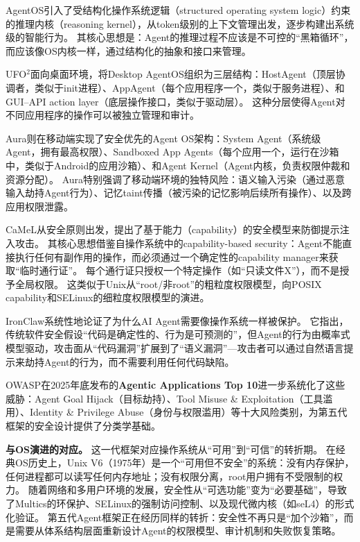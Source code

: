 AgentOS\cite{agentos2025}引入了受结构化操作系统逻辑（structured operating system logic）约束的推理内核（reasoning kernel），从token级别的上下文管理出发，逐步构建出系统级的智能行为。
其核心思想是：Agent的推理过程不应该是不可控的``黑箱循环''，而应该像OS内核一样，通过结构化的抽象和接口来管理。

UFO$^2$\cite{ufo2_2025}面向桌面环境，将Desktop AgentOS组织为三层结构：HostAgent（顶层协调者，类似于init进程）、AppAgent（每个应用程序一个，类似于服务进程）、和GUI--API action layer（底层操作接口，类似于驱动层）。
这种分层使得Agent对不同应用程序的操作可以被独立管理和审计。

Aura\cite{aura2025}则在移动端实现了安全优先的Agent OS架构：System Agent（系统级Agent，拥有最高权限）、Sandboxed App Agents（每个应用一个，运行在沙箱中，类似于Android的应用沙箱）、和Agent Kernel（Agent内核，负责权限仲裁和资源分配）。
Aura特别强调了移动端环境的独特风险：语义输入污染（通过恶意输入劫持Agent行为）、记忆taint传播（被污染的记忆影响后续所有操作）、以及跨应用权限泄露。

CaMeL\cite{debenedetti2025camel}从安全原则出发，提出了基于能力（capability）的安全模型来防御提示注入攻击。
其核心思想借鉴自操作系统中的capability-based security：Agent不能直接执行任何有副作用的操作，而必须通过一个确定性的capability manager来获取``临时通行证''。
每个通行证只授权一个特定操作（如``只读文件X''），而不是授予全局权限。
这类似于Unix从``root/非root''的粗粒度权限模型，向POSIX capability和SELinux的细粒度权限模型的演进。

IronClaw\cite{ironclaw2025}系统性地论证了为什么AI Agent需要像操作系统一样被保护。
它指出，传统软件安全假设``代码是确定性的、行为是可预测的''，但Agent的行为由概率式模型驱动，攻击面从``代码漏洞''扩展到了``语义漏洞''---攻击者可以通过自然语言提示来劫持Agent的行为，而不需要利用任何代码缺陷。

OWASP在2025年底发布的\textbf{Agentic Applications Top 10}\cite{owasp_agentic2026}进一步系统化了这些威胁：Agent Goal Hijack（目标劫持）、Tool Misuse \& Exploitation（工具滥用）、Identity \& Privilege Abuse（身份与权限滥用）等十大风险类别，为第五代框架的安全设计提供了分类学基础。

\textbf{与OS演进的对应。}
这一代框架对应操作系统从``可用''到``可信''的转折期。
在经典OS历史上，Unix V6（1975年）是一个``可用但不安全''的系统：没有内存保护，任何进程都可以读写任何内存地址；没有权限分离，root用户拥有不受限制的权力。
随着网络和多用户环境的发展，安全性从``可选功能''变为``必要基础''，导致了Multics的环保护、SELinux的强制访问控制、以及现代微内核（如seL4）的形式化验证\cite{ostep_2023}。
第五代Agent框架正在经历同样的转折：安全性不再只是``加个沙箱''，而是需要从体系结构层面重新设计Agent的权限模型、审计机制和失败恢复策略。

